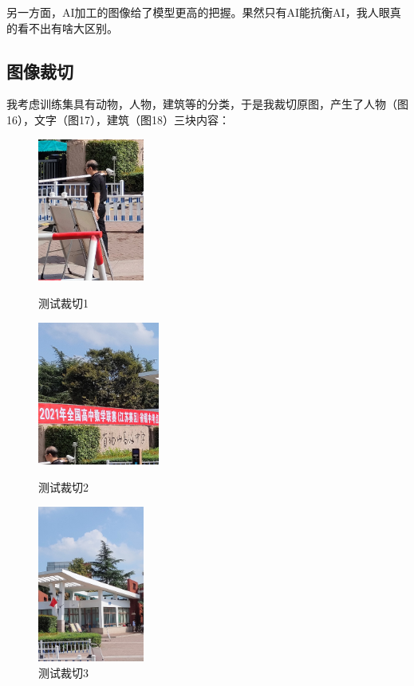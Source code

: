 \documentclass[boldfont,linespread=1.35]{ctexart}
\begin{document}
另一方面，AI加工的图像给了模型更高的把握。果然只有AI能抗衡AI，我人眼真的看不出有啥大区别。

\subsection{图像裁切}
我考虑训练集具有动物，人物，建筑等的分类，于是我裁切原图，产生了人物（图16），文字（图17），建筑（图18）三块内容：
\begin{figure}[h]
	\centering
	\begin{minipage}[t]{0.3\linewidth}
		\centering
		\includegraphics[width=3.5cm]{../测试图/测试裁切1}
		\color{gray}\caption{测试裁切1}
	\end{minipage}
	\begin{minipage}[t]{0.3\linewidth} %
		\centering
		\includegraphics[width=4cm]{../测试图/测试裁切2}
		\color{gray}\caption{测试裁切2}
	\end{minipage}
	\begin{minipage}[t]{0.3\linewidth} %
		\centering
		\includegraphics[width=3.5cm]{../测试图/测试裁切3}
		\color{gray}\caption{测试裁切3}
	\end{minipage}
\end{figure}
\end{document}
